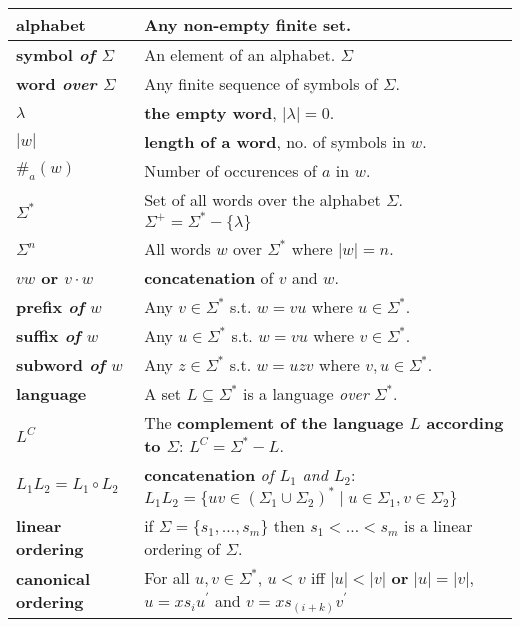 \setlength{\tabcolsep}{6pt}
\begin{tabu} to 
  alphabet \norm{($\Sigma$)} & Any non-empty finite set.\\ \hline
  symbol {\it of $\Sigma$} & An element of an alphabet.
  $\Sigma$\\ \hline
  word {\it over $\Sigma$} & Any finite sequence of symbols of $\Sigma$.
  \\ \hline
  $\lambda$ & {\bf the empty word}, $|\lambda| = 0$. \\ \hline
  $| w |$ & {\bf length of a word}, no. of symbols in $w$. \\ \hline
  $\#_a(w)$ & Number of occurences of $a$ in $w$. \\ \hline
  $\Sigma^*$ & Set of all words over the alphabet $\Sigma$. \newline
  $\Sigma^+ = \Sigma^* - \{\lambda\}$ \\ \hline
  $\Sigma^n$ & All words $w$ over $\Sigma^*$ where $| w | = n$.
  \\ \hline
  $vw$ or $v \cdot w$ & {\bf concatenation} of $v$ and $w$. \\ \hline
  prefix {\it of} $w$ & Any $v \in \Sigma^*$ s.t. $w = vu$ where $u \in \Sigma^*$.
  \\ \hline
  suffix {\it of} $w$ & Any $u \in \Sigma^*$ s.t. $w = vu$ where $v \in \Sigma^*$.
  \\ \hline
  subword {\it of} $w$ & Any $z \in \Sigma^*$ s.t. $w = uzv$ where  $v, u \in
  \Sigma^*$. \\ \hline
  language  & A set $L \subseteq \Sigma^*$ is a language {\it over}
  $\Sigma^*$. \\ \hline
  $L^C$ & The {\bf complement of the language $L$ according to $\Sigma$}:
  $L^C = \Sigma^* - L$. \\ \hline
  $L_1L_2 = L_1 \circ L_2$ & {\bf concatenation} {\it of $L_1$ and $L_2$}: \newline
  $L_1L_2 = \{uv \in \left(\Sigma_1 \cup \Sigma_2 \right)^* \mid u \in \Sigma_1,
  v \in \Sigma_2\}$ \\ \hline
  linear \newline ordering & if $\Sigma = \{s_1, \ldots, s_m\}$ then
  $s_1 < \ldots < s_m$ is a linear ordering of $\Sigma$. \\ \hline
  canonical \newline ordering & For all $u,v \in \Sigma^*$, $u < v$ iff $| u
  | < | v |$ {\bf or} $| u | = | v |$, $u = xs_iu^\prime$
  and $v = xs_{(i+k)}v^\prime$ \\ \hline

\end{tabu}
